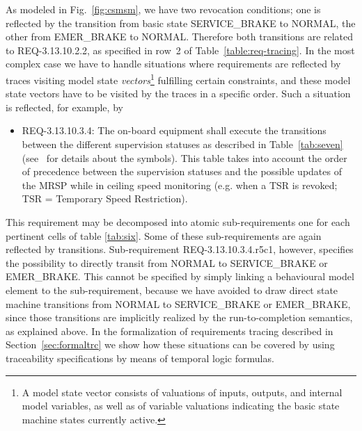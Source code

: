 As modeled in Fig.~\ref{fig:csmsm}, we have two revocation conditions; one is reflected by the transition from basic state {\sf SERVICE\_BRAKE} to {\sf NORMAL}, the other from {\sf EMER\_BRAKE} to {\sf NORMAL}. Therefore both transitions are related to REQ-3.13.10.2.2, as specified in row~2 of Table~\ref{table:req-tracing}.
In the  most complex case we have to handle situations where requirements are reflected by traces visiting model state {\it vectors}\footnote{A model state vector consists of valuations of  inputs, outputs, and internal model variables, as well as of variable valuations indicating the basic state machine states currently active.} fulfilling certain constraints, and these model state vectors have to be visited by the traces in a specific order. Such a situation is reflected, for example, by 
\begin{itemize}
\item REQ-3.13.10.3.4:
The on-board equipment shall execute the transitions between the different supervision statuses as described in Table~\ref{tab:seven} (see~\cite[4.6.1]{ETCSSRS-Principles} for details about the symbols). This table takes into account the order of precedence between the supervision statuses and the possible updates of the MRSP while in ceiling speed monitoring (e.g. when a TSR is revoked; TSR = Temporary Speed Restriction).
\end{itemize}


This requirement may be decomposed into atomic sub-requirements one
for each pertinent cells of table \ref{tab:six}.  Some of these
sub-requirements are again reflected by transitions. Sub-requirement
REQ-3.13.10.3.4.r5c1, however, specifies the possibility to directly
transit from {\sf NORMAL} to {\sf SERVICE\_BRAKE} or {\sf
  EMER\_BRAKE}. This cannot be specified by simply linking a
behavioural model element to the sub-requirement, because we have avoided
to draw direct state machine transitions from {\sf NORMAL} to {\sf
  SERVICE\_BRAKE} or {\sf EMER\_BRAKE}, since those transitions are
implicitly realized by the run-to-completion semantics, as explained
above. In the formalization of requirements tracing described in
Section~\ref{sec:formaltrc} we show how these situations can be
covered by using traceability specifications by means of temporal
logic formulas.
















